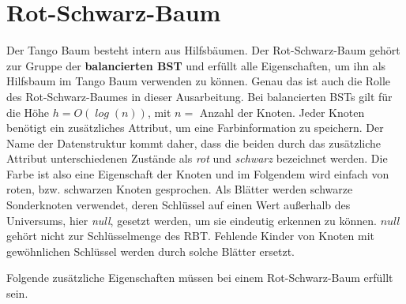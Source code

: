 \documentclass[a4paper,12pt]{article}
\begin{document}
\section{Rot-Schwarz-Baum}
Der Tango Baum besteht intern aus Hilfsbäumen. Der Rot-Schwarz-Baum gehört zur Gruppe der \textbf{balancierten BST} und erfüllt alle Eigenschaften, um ihn als Hilfsbaum im Tango Baum verwenden zu können. Genau das ist auch die Rolle des Rot-Schwarz-Baumes in dieser Ausarbeitung. Bei balancierten BSTs gilt für die Höhe $h = \mathit{O(\log\left( n\right))}$, mit $n =$ Anzahl der Knoten. Jeder Knoten benötigt ein zusätzliches Attribut, um eine Farbinformation zu speichern. Der Name der Datenstruktur kommt daher, dass die beiden durch das zusätzliche Attribut unterschiedenen Zustände als \textit{rot} und \textit{schwarz} bezeichnet werden. Die Farbe ist also eine Eigenschaft der Knoten und im Folgendem wird einfach von roten, bzw. schwarzen Knoten gesprochen. Als Blätter werden schwarze Sonderknoten verwendet, deren Schlüssel auf einen Wert außerhalb des Universums, hier \textit{null}, gesetzt werden, um sie eindeutig erkennen zu können. $\mathit{null}$ gehört nicht zur Schlüsselmenge des RBT. Fehlende Kinder von Knoten mit gewöhnlichen Schlüssel werden durch solche Blätter ersetzt.  

\noindent Folgende zusätzliche Eigenschaften müssen bei einem Rot-Schwarz-Baum erfüllt sein. 
\end{document}
